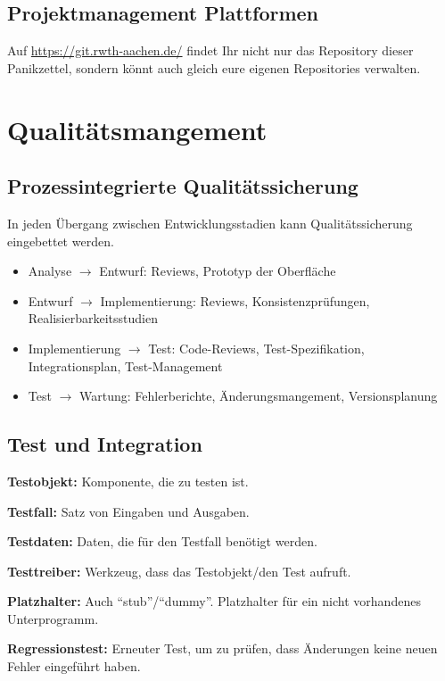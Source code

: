 \documentclass{panikzettel}
\begin{document}
\subsection{Projektmanagement Plattformen}

Auf \url{https://git.rwth-aachen.de/} findet Ihr nicht nur das Repository dieser Panikzettel, sondern könnt auch gleich eure eigenen Repositories verwalten.

\section{Qualitätsmangement}

\subsection{Prozessintegrierte Qualitätssicherung}

In jeden Übergang zwischen Entwicklungsstadien kann Qualitätssicherung eingebettet werden.

\begin{itemize}
\item Analyse $\to$ Entwurf: Reviews, Prototyp der Oberfläche
\item Entwurf $\to$ Implementierung: Reviews, Konsistenzprüfungen, Realisierbarkeitsstudien
\item Implementierung $\to$ Test: Code-Reviews, Test-Spezifikation, Integrationsplan, Test-Management
\item Test $\to$ Wartung: Fehlerberichte, Änderungsmangement, Versionsplanung
\end{itemize}


\subsection{Test und Integration}

\textbf{Testobjekt:} Komponente, die zu testen ist.

\textbf{Testfall:} Satz von Eingaben und Ausgaben.

\textbf{Testdaten:} Daten, die für den Testfall benötigt werden.

\textbf{Testtreiber:} Werkzeug, dass das Testobjekt/den Test aufruft.

\textbf{Platzhalter:} Auch ``stub''/``dummy''. Platzhalter für ein nicht vorhandenes Unterprogramm.

\textbf{Regressionstest:} Erneuter Test, um zu prüfen, dass Änderungen keine neuen Fehler eingeführt haben.
\end{document}

